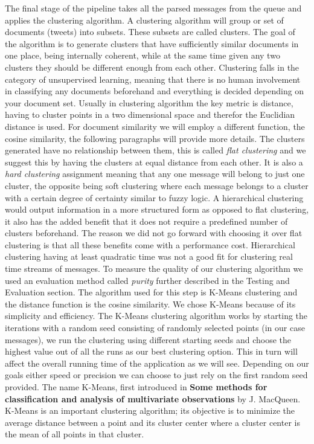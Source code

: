 The final stage of the pipeline takes all the parsed messages from the queue and applies the clustering algorithm.
\newline
A clustering algorithm will group or set of documents (tweets) into subsets. These subsets are called clusters. The goal of the algorithm is to generate clusters that have sufficiently similar documents in one place, being internally coherent, while at the same time given any two clusters they should be different enough from each other.
\newline
Clustering falls in the category of unsupervised learning, meaning that there is no human involvement in classifying any documents beforehand and everything is decided depending on your document set. Usually in clustering algorithm the key metric is distance, having to cluster points in a two dimensional space and therefor the Euclidian distance is used. For document similarity we will employ a different function, the cosine similarity, the following paragraphs will provide more details.
\newline
The clusters generated have no relationship between them, this is called \textit{flat clustering} and we suggest this by having the clusters at equal distance from each other. It is also a \textit{hard clustering} assignment meaning that any one message will belong to just one cluster, the opposite being soft clustering where each message belongs to a cluster with a certain degree of certainty similar to fuzzy logic.
\newline
A hierarchical clustering would output information in a more structured form as opposed to flat clustering, it also has the added benefit that it does not require a predefined number of clusters beforehand. The reason we did not go forward with choosing it over flat clustering is that all these benefits come with a performance cost. Hierarchical clustering having at least quadratic time was not a good fit for clustering real time streams of messages.
\newline
To measure the quality of our clustering algorithm we used an evaluation method called \textit{purity} further described in the Testing and Evaluation section.
\newline
The algorithm used for this step is K-Means clustering and the distance function is the cosine similarity. We chose K-Means because of its simplicity and efficiency. The K-Means clustering algorithm works by starting the iterations with a random seed consisting of randomly selected points (in our case messages), we run the clustering using different starting seeds and choose the highest value out of all the runs as our best clustering option. This in turn will affect the overall running time of the application as we will see. Depending on our goals either speed or precision we can choose to just rely on the first random seed provided.
The name K-Means, first introduced in \textbf{Some methods for classification and analysis of multivariate observations} by J. MacQueen. K-Means is an important clustering algorithm; its objective is to minimize the average distance between a point and its cluster center where a cluster center is the mean of all points in that cluster.

